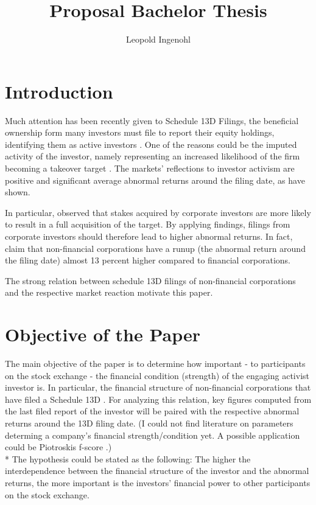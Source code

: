 \documentclass[12pt]{article}
\title{Proposal Bachelor Thesis}
\author{Leopold Ingenohl}
\begin{document}
\maketitle

\section{Introduction}
Much attention has been recently given to Schedule 13D Filings, the beneficial ownership form many investors must file to report their equity holdings, identifying them as active investors \citep{Giglia2018}. One of the reasons could be the imputed activity of the investor, namely representing an increased likelihood of the firm becoming a takeover target \citep{Brigida2012}. The markets' reflections to investor activism are positive and significant average abnormal returns around the filing date, as \citet{Brav2008} have shown.

In particular, \citet{Akhigbe2007} observed that stakes acquired by corporate investors are more likely to result in a full acquisition of the target. By applying \citep{Brav2008} findings, filings from corporate investors should therefore lead to higher abnormal returns. In fact, \citet{Brigida2012} claim that non-financial corporations have a runup (the abnormal return around the filing date) almost 13 percent higher compared to financial corporations.

The strong relation between schedule 13D filings of non-financial corporations and the respective market reaction motivate this paper.


\section{Objective of the Paper}
The main objective of the paper is to determine how important - to participants on the stock exchange - the financial condition (strength) of the engaging activist investor is. In particular, the financial structure of non-financial corporations that have filed a Schedule 13D \citep{Bell2017}. 
For analyzing this relation, key figures computed from the last filed report of the investor will be paired with the respective abnormal returns around the 13D filing date. (I could not find literature on parameters determing a company's financial strength/condition yet. A possible application could be Piotroskis f-score \citep{Piotroski2000}.)\\*
The hypothesis could be stated as the following: The higher the interdependence between the financial structure of the investor and the abnormal returns, the more important is the investors' financial power to other participants on the stock exchange.
\pagebreak
\end{document}
